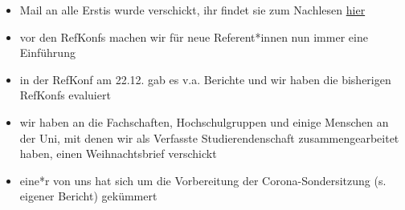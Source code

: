 \begin{itemize}
    \item Mail an alle Erstis wurde verschickt, ihr findet sie zum Nachlesen \href{https://www.stura.uni-heidelberg.de/2020/12/17/rundmail-drei-ratschlaege-fuer-alle-erstis/}{hier}
    \item vor den RefKonfs machen wir für neue Referent*innen nun immer eine Einführung
    \item in der RefKonf am 22.12. gab es v.a. Berichte und wir haben die bisherigen RefKonfs evaluiert
    \item wir haben an die Fachschaften, Hochschulgruppen und einige Menschen an der Uni, mit denen wir als Verfasste Studierendenschaft zusammengearbeitet haben, einen Weihnachtsbrief verschickt
    \item eine*r von uns hat sich um die Vorbereitung der Corona-Sondersitzung (s. eigener Bericht) gekümmert
\end{itemize}
